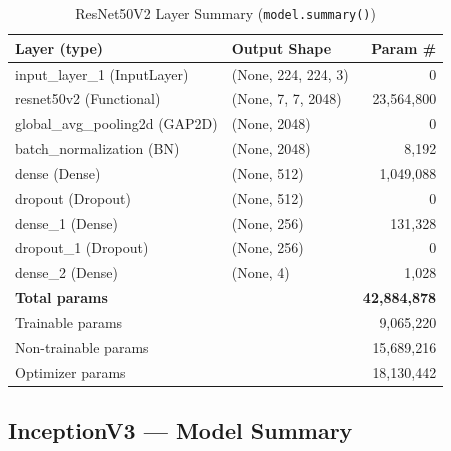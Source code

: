 \documentclass[12pt,a4paper]{article}
\begin{document}
\begin{table}[H]
\centering
\caption{ResNet50V2 Layer Summary (\texttt{model.summary()})}
\label{tab:summary_resnet50v2}
\begin{tabular}{l l r}
  \toprule
  \textbf{Layer (type)} & \textbf{Output Shape} & \textbf{Param \#} \\
  \midrule
  input\_layer\_1 (InputLayer)         & (None, 224, 224, 3)  &            0 \\
  resnet50v2 (Functional)              & (None, 7, 7, 2048)   &   23,564,800 \\
  global\_avg\_pooling2d (GAP2D)       & (None, 2048)         &            0 \\
  batch\_normalization (BN)            & (None, 2048)         &        8,192 \\
  dense (Dense)                        & (None, 512)          &    1,049,088 \\
  dropout (Dropout)                    & (None, 512)          &            0 \\
  dense\_1 (Dense)                     & (None, 256)          &      131,328 \\
  dropout\_1 (Dropout)                 & (None, 256)          &            0 \\
  dense\_2 (Dense)                     & (None, 4)            &        1,028 \\
  \midrule
  \multicolumn{2}{l}{\textbf{Total params}}    & \textbf{42,884,878} \\
  \multicolumn{2}{l}{Trainable params}         &       9,065,220 \\
  \multicolumn{2}{l}{Non-trainable params}     &      15,689,216 \\
  \multicolumn{2}{l}{Optimizer params}         &      18,130,442 \\
  \bottomrule
\end{tabular}
\end{table}

\subsection{InceptionV3 --- Model Summary}
\end{document}
